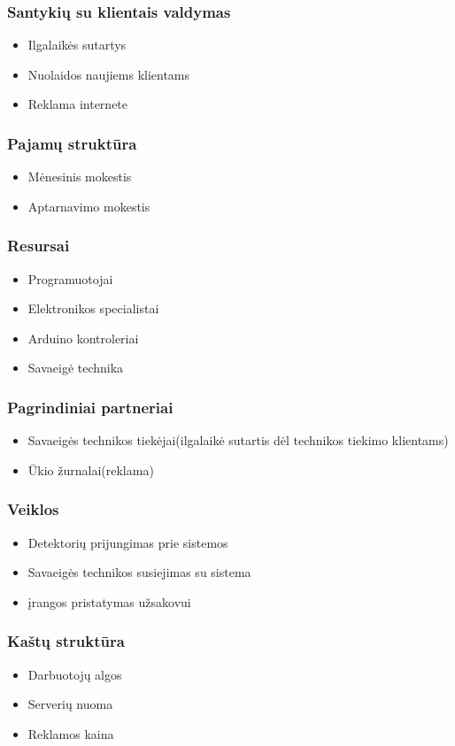 \documentclass[oneside]{VUMIFPSkursinis}
\begin{document}
	\subsubsection{Santykių su klientais valdymas}
	\begin{itemize}
	\item Ilgalaikės sutartys
	\item Nuolaidos naujiems klientams
	\item Reklama internete
	\end{itemize}
	\subsubsection{Pajamų struktūra}
	\begin{itemize}
	\item Mėnesinis mokestis
	\item Aptarnavimo mokestis
	\end{itemize}
	\subsubsection{Resursai}
	\begin{itemize}
	\item Programuotojai
	\item Elektronikos specialistai
	\item Arduino kontroleriai
	\item Savaeigė technika
	\end{itemize}
	\subsubsection{Pagrindiniai partneriai}
	\begin{itemize}
	\item Savaeigės technikos tiekėjai(ilgalaikė sutartis dėl technikos tiekimo klientams)
	\item Ūkio žurnalai(reklama)
	\end{itemize}
	\subsubsection{Veiklos}
	\begin{itemize}
	\item Detektorių prijungimas prie sistemos
	\item Savaeigės technikos susiejimas su sistema
	\item įrangos pristatymas užsakovui
	\end{itemize}
	\subsubsection{Kaštų struktūra}
	\begin{itemize}
	\item Darbuotojų algos
	\item Serverių nuoma
	\item Reklamos kaina
	\end{itemize}
\end{document}
